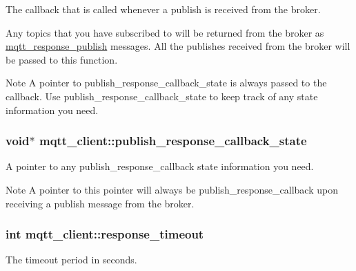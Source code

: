 The callback that is called whenever a publish is received from the broker. 

Any topics that you have subscribed to will be returned from the broker as \hyperlink{structmqtt__response__publish}{mqtt\+\_\+response\+\_\+publish} messages. All the publishes received from the broker will be passed to this function.

\begin{DoxyNote}{Note}
A pointer to publish\+\_\+response\+\_\+callback\+\_\+state is always passed to the callback. Use publish\+\_\+response\+\_\+callback\+\_\+state to keep track of any state information you need. 
\end{DoxyNote}
\subsubsection[{\texorpdfstring{publish\+\_\+response\+\_\+callback\+\_\+state}{publish_response_callback_state}}]{\setlength{\rightskip}{0pt plus 5cm}void$\ast$ mqtt\+\_\+client\+::publish\+\_\+response\+\_\+callback\+\_\+state}\hypertarget{structmqtt__client_a948d816462128ef2216c230644407f21}{}\label{structmqtt__client_a948d816462128ef2216c230644407f21}


A pointer to any publish\+\_\+response\+\_\+callback state information you need. 

\begin{DoxyNote}{Note}
A pointer to this pointer will always be publish\+\_\+response\+\_\+callback upon receiving a publish message from the broker. 
\end{DoxyNote}
\subsubsection[{\texorpdfstring{response\+\_\+timeout}{response_timeout}}]{\setlength{\rightskip}{0pt plus 5cm}int mqtt\+\_\+client\+::response\+\_\+timeout}\hypertarget{structmqtt__client_a4ee652148f2b1b338f1527a85879e970}{}\label{structmqtt__client_a4ee652148f2b1b338f1527a85879e970}


The timeout period in seconds. 

